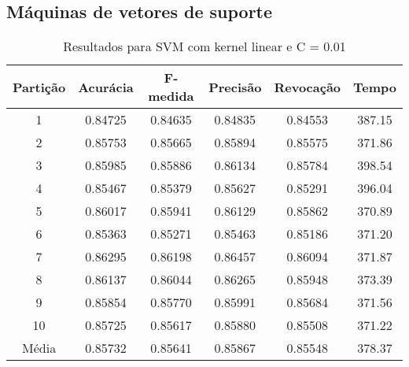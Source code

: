 \subsection{Máquinas de vetores de suporte}

\begin{table}[h]
\centering
\caption{Resultados para SVM com kernel linear e C = 0.01}
\vspace{0.2cm}
\begin{tabular}{c|c|c|c|c|c}
Partição & Acurácia & F-medida & Precisão & Revocação & Tempo \\
\hline
1  & 0.84725 & 0.84635 & 0.84835 & 0.84553 & 387.15 \\ 
2  & 0.85753 & 0.85665 & 0.85894 & 0.85575 & 371.86 \\
3  & 0.85985 & 0.85886 & 0.86134 & 0.85784 & 398.54 \\
4  & 0.85467 & 0.85379 & 0.85627 & 0.85291 & 396.04 \\
5  & 0.86017 & 0.85941 & 0.86129 & 0.85862 & 370.89 \\
6  & 0.85363 & 0.85271 & 0.85463 & 0.85186 & 371.20 \\
7  & 0.86295 & 0.86198 & 0.86457 & 0.86094 & 371.87 \\
8  & 0.86137 & 0.86044 & 0.86265 & 0.85948 & 373.39 \\
9  & 0.85854 & 0.85770 & 0.85991 & 0.85684 & 371.56 \\
10 & 0.85725 & 0.85617 & 0.85880 & 0.85508 & 371.22 \\
\hline
Média & 0.85732 & 0.85641 & 0.85867 & 0.85548 & 378.37 \\

\end{tabular} 
\label{table:resultadosSVMLinear}
\end{table}

